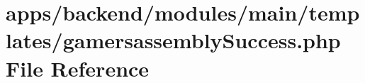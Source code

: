 \hypertarget{gamersassembly_success_8php}{\section{apps/backend/modules/main/templates/gamersassembly\-Success.php File Reference}
\label{gamersassembly_success_8php}
}
